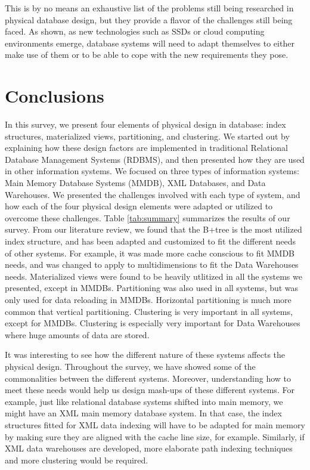 \documentclass[12pt,a4paper]{article}
\begin{document}
This is by no means an exhaustive list of the problems still being researched in physical database design, but they provide a flavor of the challenges still
being faced. As shown, as new technologies such as SSDs or cloud computing environments emerge, database systems will need to adapt themselves to either make
use of them or to be able to cope with the new requirements they pose.

\section{Conclusions}
\label{SEC-CONCL}

In this survey, we present four elements of physical design in database: index structures, materialized views, partitioning, and clustering. We started out
by explaining how these design factors are implemented in traditional Relational Database Management Systems (RDBMS), and then presented how they are used in
other information systems. We focused on three types of information systems: Main Memory Database Systems (MMDB), XML Databases, and Data Warehouses. We
presented the challenges involved with each type of system, and how each of the four physical design elements were adapted or utilized to overcome these
challenges. Table \ref{tab:summary} summarizes the results of our survey. From our literature review, we found that the B+tree is the most utilized index
structure, and has been adapted and customized to fit the different needs of other systems. For example, it was made more cache conscious to fit MMDB needs,
and was changed to apply to multidimensions to fit the Data Warehouses needs. Materialized views were found to be heavily utlitized in all the systems we
presented, except in MMDBs. Partitioning was also used in all systems, but was only used for data reloading in MMDBs. Horizontal partitioning is much more
common that vertical partitioning. Clustering is very important in all systems, except for MMDBs. Clustering is especially very important for Data Warehouses
where huge amounts of data are stored.

It was interesting to see how the different nature of these systems affects the physical design. Throughout the survey, we have showed some of the
commonalities between the different systems. Moreover, understanding how to meet these needs would help us design mash-ups of these different systems. For
example, just like relational database systems shifted into main memory, we might have an XML main memory database system. In that case, the index structures
fitted for XML data indexing will have to be adapted for main memory by making sure they are aligned with the cache line size, for example. Similarly, if XML
data warehouses are developed, more elaborate path indexing techniques and more clustering would be required. 
\end{document}
